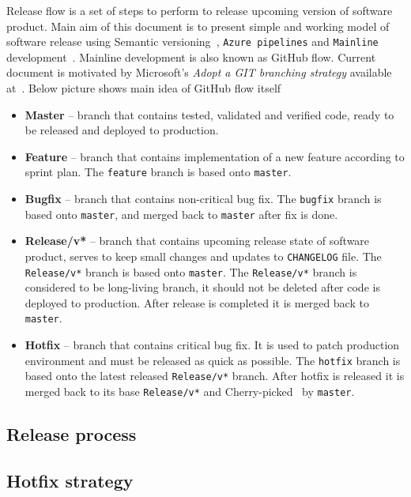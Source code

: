 Release flow is a set of steps to perform to release upcoming version of software product.
Main aim of this document is to present simple and working model of software release
using Semantic versioning~\cite{SemanticVersioning}, \texttt{Azure pipelines}
and \texttt{Mainline} development~\cite{MainlineDevelopment}.
Mainline development is also known as GitHub flow.
Current document is motivated by Microsoft's
\textit{Adopt a GIT branching strategy} available at~\cite{AdoptGitStrategy}.
Below picture shows main idea of GitHub flow itself

\begin{itemize}
    \item \textbf{Master} -- branch that contains tested, validated and verified code, ready to be released and deployed to production.
    \item \textbf{Feature} -- branch that contains implementation of a new feature according to sprint plan.
    The \texttt{feature} branch is based onto \texttt{master}.
    \item \textbf{Bugfix} -- branch that contains non-critical bug fix.
    The \texttt{bugfix} branch is based onto \texttt{master}, and merged back to \texttt{master} after fix is done.
    \item \textbf{Release/v*} -- branch that contains upcoming release state of software product, serves to keep small changes
    and updates to \texttt{CHANGELOG} file.
    The \texttt{Release/v*} branch is based onto \texttt{master}.
    The \texttt{Release/v*} branch is considered to be long-living branch, it should not be deleted after code is deployed to production.
    After release is completed it is merged back to \texttt{master}.
    \item \textbf{Hotfix} -- branch that contains critical bug fix.
    It is used to patch production environment and must be released as quick as possible.
    The \texttt{hotfix} branch is based onto the latest released \texttt{Release/v*} branch.
    After hotfix is released it is merged back to its base \texttt{Release/v*} and Cherry-picked~\cite{CherryPick}
    by \texttt{master}.
\end{itemize}

\subsection{Release process}\label{subsec:release-process}


\subsection{Hotfix strategy}\label{subsec:hotfix-strategy}


